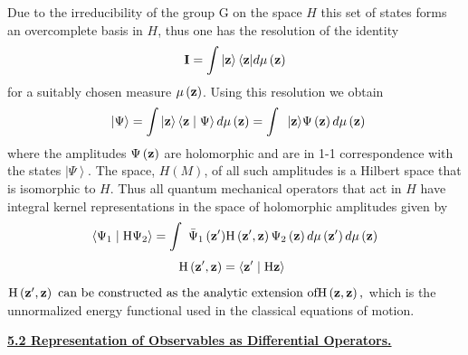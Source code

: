\documentclass{amsart}
\begin{document}
Due to the irreducibility of the group G on the space $H$ this set of states
forms an overcomplete basis in $H$, thus one has the resolution of the
identity
\[
{\rm {\bf I}}=\int {\left| {\rm {\bf z}} \right\rangle \left\langle {\rm
{\bf z}} \right|} d\mu \left( {\rm {\bf z}} \right)
\]
for a suitably chosen measure $\mu \left( {\rm {\bf z}} \right)$. Using this
resolution we obtain
\[
\mbox{ }\left| \Psi \right\rangle =\int {\left| {\rm {\bf z}} \right\rangle
} \left\langle {{\rm {\bf z}}} \mathrel{\left| {\vphantom {{\rm {\bf z}}
\Psi }} \right. \kern-\nulldelimiterspace} {\Psi } \right\rangle d\mu \left(
{\rm {\bf z}} \right)=\int {\mbox{ }\left| {\rm {\bf z}} \right\rangle }
\Psi \left( {\rm {\bf z}} \right)d\mu \left( {\rm {\bf z}} \right)
\]
where the amplitudes $\Psi \left( {\rm {\bf z}} \right)$ are holomorphic and
are in 1-1 correspondence with the states $\left| \Psi \right\rangle $. The
space, $H\left( M \right)$, of all such amplitudes is a Hilbert space that
is isomorphic to $H$. Thus all quantum mechanical operators that act in $H$
have integral kernel representations in the space of holomorphic amplitudes
given by
\[
\left\langle {\Psi _1 } \mathrel{\left| {\vphantom {{\Psi _1 } {\mbox{H}\Psi
_2 }}} \right. \kern-\nulldelimiterspace} {\mbox{H}\Psi _2 } \right\rangle
=\int {\mbox{ }\bar {\Psi }_1 \left( {{\rm {\bf {z}'}}} \right)}
\mbox{H}\left( {{\rm {\bf {z}'}},{\rm {\bf z}}} \right)\Psi _2 \left( {\rm
{\bf z}} \right)d\mu \left( {{\rm {\bf {z}'}}} \right)d\mu \left( {\rm {\bf
z}} \right)
\]
\[
\mbox{H}\left( {{\rm {\bf {z}'}},{\rm {\bf z}}} \right)=\left\langle {{\rm
{\bf {z}'}}} \mathrel{\left| {\vphantom {{{\rm {\bf {z}'}}} {\mbox{H}{\rm
{\bf z}}}}} \right. \kern-\nulldelimiterspace} {\mbox{H}{\rm {\bf z}}}
\right\rangle \mbox{ }
\]
$\mbox{H}\left( {{\rm {\bf {z}'}},{\rm {\bf z}}} \right)\mbox{ can be
constructed as the analytic extension of}
\mbox{H}\left( {{\rm {\bf z}},{\rm {\bf z}}} \right),$ which is the
unnormalized energy functional used in the classical equations of motion.

\underline {\textbf{5.2 Representation of Observables as Differential
Operators. }}
\end{document}
